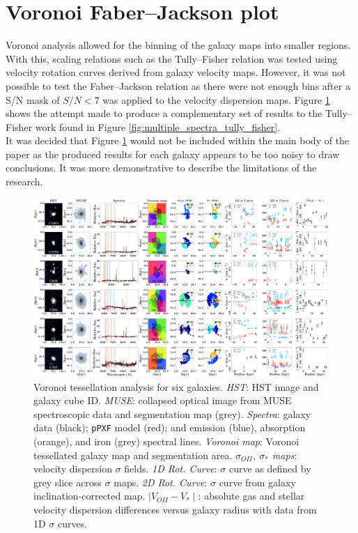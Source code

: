 \documentclass[12pt, twocolumn, nofootinbib]{revtex4-1}    %
\begin{document}
\vspace{2ex} %
\section{Voronoi Faber--Jackson plot} \label{appendix:voronoi_faber_jackson}
\noindent
Voronoi analysis allowed for the binning of the galaxy maps into smaller regions. With this, scaling relations such as the Tully--Fisher relation was tested using velocity rotation curves derived from galaxy velocity maps. However, it was not possible to test the Faber--Jackson relation as there were not enough bins after a S/N mask of $S/N<7$ was applied to the velocity dispersion maps. Figure \ref{fig:multiple_spectra_faber_jackson} shows the attempt made to produce a complementary set of results to the Tully--Fisher work found in Figure \ref{fig:multiple_spectra_tully_fisher}. \\

It was decided that Figure \ref{fig:multiple_spectra_faber_jackson} would not be included within the main body of the paper as the produced results for each galaxy appears to be too noisy to draw conclusions. It was more demonstrative to describe the limitations of the research.

\begin{figure}
\includegraphics[width=1.0\textheight,height=0.6\textwidth]{data/spectra_complete_velocity_dispersions.pdf}
\caption[Faber--Jackson]{Voronoi tessellation analysis for six galaxies. \textit{HST}: HST image and galaxy cube ID. \textit{MUSE}: collapsed optical image from MUSE spectroscopic data and segmentation map (grey). \textit{Spectra}: galaxy data (black); \texttt{pPXF} model (red); and emission (blue), absorption (orange), and iron (grey) spectral lines. \textit{Voronoi map}: Voronoi tessellated galaxy map and segmentation area. \textit{$\sigma_{OII}$, $\sigma_{*}$ maps}: velocity dispersion $\sigma$ fields. \textit{1D Rot. Curve}: $\sigma$ curve as defined by grey slice across $\sigma$ maps. \textit{2D Rot. Curve}: $\sigma$ curve from galaxy inclination-corrected map. \textit{$\mid V_{OII}-V_* \mid$}: absolute gas and stellar velocity dispersion differences versus galaxy radius with data from 1D $\sigma$ curves.}
\label{fig:multiple_spectra_faber_jackson}
\end{figure}
\end{document}
